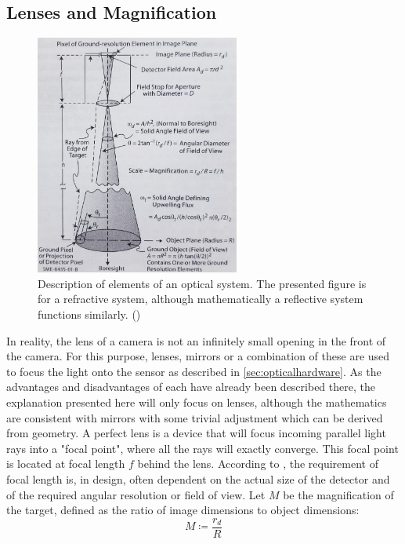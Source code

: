 \subsection{Lenses and Magnification}
\begin{figure}
    \centering
    \includegraphics[width=0.6\textwidth]{images/optics.png}
    \caption{Description of elements of an optical system. The presented figure is for a refractive system, although mathematically a reflective system functions similarly. (\cite{SMAD})}
    \label{fig:smadoptics}
\end{figure}
In reality, the lens of a camera is not an infinitely small opening in the front of the camera. For this purpose, lenses, mirrors or a combination of these are used to focus the light onto the sensor as described in \autoref{sec:opticalhardware}. As the advantages and disadvantages of each have already been described there, the explanation presented here will only focus on lenses, although the mathematics are consistent with mirrors with some trivial adjustment which can be derived from geometry. A perfect lens is a device that will focus incoming parallel light rays into a "focal point", where all the rays will exactly converge. This focal point is located at focal length $f$ behind the lens. According to \cite{SMAD}, the requirement of focal length is, in design, often dependent on the actual size of the detector and of the required angular resolution or field of view. Let $M$ be the magnification of the target, defined as the ratio of image dimensions to object dimensions:
\begin{equation}
    M \coloneq \frac{r_d}{R}
\end{equation}
